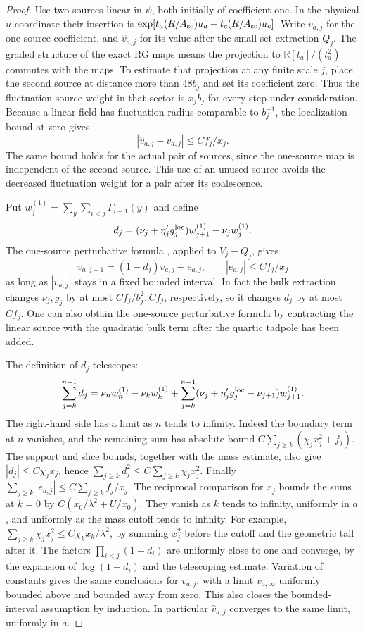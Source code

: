 \documentclass[11pt]{article}
\begin{document}
\begin{proof}
Use two sources linear in \(\psi\), both initially of coefficient
one. In the physical \(u\) coordinate their insertion is
\(\exp[t_a(R/A_{\rm sc})u_a+t_c(R/A_{\rm sc})u_c]\).
Write \(v_{a,j}\) for the one-source coefficient, and
\(\widehat v_{a,j}\) for its value after the small-set
extraction \(Q_j\). The graded structure of the exact RG maps
means the projection to \(\mathbb R[t_a]/(t_a^2)\)
commutes with the maps. To estimate that projection at any
finite scale \(j\), place the second source at distance more
than \(48b_j\) and set its coefficient zero. Thus the
fluctuation source weight in that sector is \(x_j b_j\) for
every step under consideration. Because a linear field has
fluctuation radius comparable to \(b_j^{-1}\), the localization
bound at zero gives
\[
 |\widehat v_{a,j}-v_{a,j}|
       \le C f_j/x_j.
\]
The same bound holds for the actual pair of sources, since the
one-source map is independent of the second source. This use of
an unused source avoids the decreased fluctuation weight for a
pair after its coalescence.

Put \(w_j^{(1)}=\sum_y\sum_{i<j}\Gamma_{i+1}(y)\) and define
\[
 d_j=(\nu_j+\eta'_jg_j^{\rm loc})w_{j+1}^{(1)}
                                      -\nu_j w_j^{(1)}.
\]
The one-source perturbative formula
\cite[(A.7)--(A.10)]{ParkTorus}, applied to \(V_j-Q_j\),
gives
\[
 v_{a,j+1}=(1-d_j)v_{a,j}+e_{a,j},
 \qquad |e_{a,j}|\le Cf_j/x_j
\]
as long as \(|v_{a,j}|\) stays in a fixed bounded
interval. In fact the bulk extraction changes \(\nu_j,g_j\)
by at most \(Cf_j/b_j^2,Cf_j\),
respectively, so it changes \(d_j\) by at most \(Cf_j\).
One can also obtain the one-source perturbative formula by
contracting the linear source with the quadratic bulk term
after the quartic tadpole has been added.

The definition of \(d_j\) telescopes:
\[
 \sum_{j=k}^{n-1}d_j
  =\nu_nw_n^{(1)}-\nu_kw_k^{(1)}
    +\sum_{j=k}^{n-1}(\nu_j+\eta'_jg_j^{\rm loc}-\nu_{j+1})
       w_{j+1}^{(1)}.
\]
The right-hand side has a limit as \(n\) tends to infinity.
Indeed the boundary term at \(n\) vanishes, and the remaining
sum has absolute bound
\(C\sum_{j\ge k}(\chi_jx_j^2+f_j)\).
The support and slice bounds, together with the mass estimate,
also give \(|d_j|\le C\chi_jx_j\), hence
\(\sum_{j\ge k}d_j^2\le C\sum_{j\ge k}\chi_jx_j^2\).
Finally
\(\sum_{j\ge k}|e_{a,j}|\le C\sum_{j\ge k}f_j/x_j\).
The reciprocal comparison for \(x_j\) bounds the sums at \(k=0\)
by \(C(x_0/\lambda^2+U/x_0)\). They vanish as \(k\) tends to
infinity, uniformly in \(a\), and uniformly as the mass cutoff
tends to infinity. For example,
\(\sum_{j\ge k}\chi_jx_j^2\le C\chi_k x_k/\lambda^2\), by summing
\(x_j^2\) before the cutoff and the geometric tail after it.
The factors \(\prod_{i<j}(1-d_i)\) are uniformly close to one
and converge, by the expansion of \(\log(1-d_i)\) and the
telescoping estimate. Variation of constants gives the same
conclusions for \(v_{a,j}\), with a limit
\(v_{a,\infty}\) uniformly bounded above and bounded away
from zero. This also closes the bounded-interval assumption by
induction. In particular \(\widehat v_{a,j}\) converges to
the same limit, uniformly in \(a\).


\end{proof}
\end{document}
